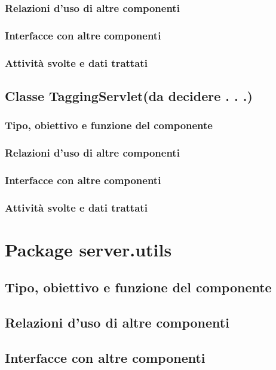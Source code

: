 \subsubsection*{Relazioni d'uso di altre componenti}
\subsubsection*{Interfacce con altre componenti}
\subsubsection*{Attivit\`a svolte e dati trattati}

\newpage
\subsection{Classe TaggingServlet(da decidere . . .)}
\subsubsection*{Tipo, obiettivo e funzione del componente}
\subsubsection*{Relazioni d'uso di altre componenti}
\subsubsection*{Interfacce con altre componenti}
\subsubsection*{Attivit\`a svolte e dati trattati}

\section{Package server.utils} %
\subsection*{Tipo, obiettivo e funzione del componente}
\subsection*{Relazioni d'uso di altre componenti}
\subsection*{Interfacce con altre componenti}
